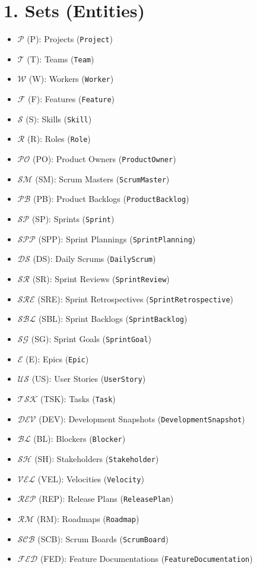 \documentclass[11pt,a4paper]{article}
\begin{document}
\section{1. Sets (Entities)}
\begin{itemize}[leftmargin=2em]
  \item $\mathcal{P}$ (P): Projects (\texttt{Project})
  \item $\mathcal{T}$ (T): Teams (\texttt{Team})
  \item $\mathcal{W}$ (W): Workers (\texttt{Worker})
  \item $\mathcal{F}$ (F): Features (\texttt{Feature})
  \item $\mathcal{S}$ (S): Skills (\texttt{Skill})
  \item $\mathcal{R}$ (R): Roles (\texttt{Role})
  \item $\mathcal{PO}$ (PO): Product Owners (\texttt{ProductOwner})
  \item $\mathcal{SM}$ (SM): Scrum Masters (\texttt{ScrumMaster})
  \item $\mathcal{PB}$ (PB): Product Backlogs (\texttt{ProductBacklog})
  \item $\mathcal{SP}$ (SP): Sprints (\texttt{Sprint})
  \item $\mathcal{SPP}$ (SPP): Sprint Plannings (\texttt{SprintPlanning})
  \item $\mathcal{DS}$ (DS): Daily Scrums (\texttt{DailyScrum})
  \item $\mathcal{SR}$ (SR): Sprint Reviews (\texttt{SprintReview})
  \item $\mathcal{SRE}$ (SRE): Sprint Retrospectives (\texttt{SprintRetrospective})
  \item $\mathcal{SBL}$ (SBL): Sprint Backlogs (\texttt{SprintBacklog})
  \item $\mathcal{SG}$ (SG): Sprint Goals (\texttt{SprintGoal})
  \item $\mathcal{E}$ (E): Epics (\texttt{Epic})
  \item $\mathcal{US}$ (US): User Stories (\texttt{UserStory})
  \item $\mathcal{TSK}$ (TSK): Tasks (\texttt{Task})
  \item $\mathcal{DEV}$ (DEV): Development Snapshots (\texttt{DevelopmentSnapshot})
  \item $\mathcal{BL}$ (BL): Blockers (\texttt{Blocker})
  \item $\mathcal{SH}$ (SH): Stakeholders (\texttt{Stakeholder})
  \item $\mathcal{VEL}$ (VEL): Velocities (\texttt{Velocity})
  \item $\mathcal{REP}$ (REP): Release Plans (\texttt{ReleasePlan})
  \item $\mathcal{RM}$ (RM): Roadmaps (\texttt{Roadmap})
  \item $\mathcal{SCB}$ (SCB): Scrum Boards (\texttt{ScrumBoard})
  \item $\mathcal{FED}$ (FED): Feature Documentations (\texttt{FeatureDocumentation})
\end{itemize}
\end{document}
